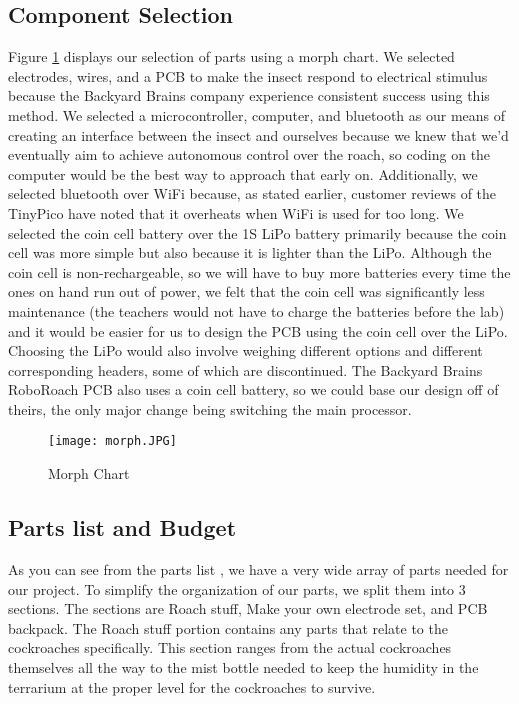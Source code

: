 \documentclass{article}
\begin{document}
\subsection{Component Selection}
\par Figure \ref{fig:morph} displays our selection of parts using a morph chart. We selected electrodes, wires, and a PCB to make the insect respond to electrical stimulus because the Backyard Brains company experience consistent success using this method. We selected a microcontroller, computer, and bluetooth as our means of creating an interface between the insect and ourselves because we knew that we'd eventually aim to achieve autonomous control over the roach, so coding on the computer would be the best way to approach that early on. Additionally, we selected bluetooth over WiFi because, as stated earlier, customer reviews of the TinyPico have noted that it overheats when WiFi is used for too long. We selected the coin cell battery over the 1S LiPo battery primarily because the coin cell was more simple but also because it is lighter than the LiPo. Although the coin cell is non-rechargeable, so we will have to buy more batteries every time the ones on hand run out of power, we felt that the coin cell was significantly less maintenance (the teachers would not have to charge the batteries before the lab) and it would be easier for us to design the PCB using the coin cell over the LiPo. Choosing the LiPo would also involve weighing different options and different corresponding headers, some of which are discontinued. The Backyard Brains RoboRoach PCB also uses a coin cell battery, so we could base our design off of theirs, the only major change being switching the main processor.

\begin{figure}[ht!]
\centering
\texttt{[image: morph.JPG]}
\caption{Morph Chart}
\label{fig:morph}
\end{figure}

\subsection{Parts list and Budget}
As you can see from the parts list , we have a very wide array of parts needed for our project. To simplify the organization of our parts, we split them into 3 sections. The sections are Roach stuff, Make your own electrode set, and PCB backpack. The Roach stuff portion contains any parts that relate to the cockroaches specifically. This section ranges from the actual cockroaches themselves all the way to the mist bottle needed to keep the humidity in the terrarium at the proper level for the cockroaches to survive.
\end{document}
